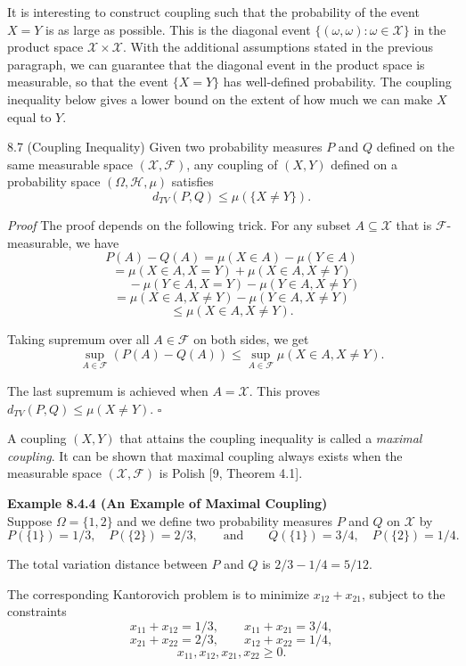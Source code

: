 It is interesting to construct coupling such that the probability of the event $X=Y$ is as large as possible. This is the diagonal event $\{(\omega,\omega): \omega\in \mathcal{X}\}$ in the product space $\mathcal{X}\times \mathcal{X}$. With the additional assumptions stated in the previous paragraph, we can guarantee that the diagonal event in the product space is measurable, so that the event $\{X=Y\}$ has well-defined probability. The coupling inequality below gives a lower bound on the extent of how much we can make $X$ equal to $Y$.

\begin{thmbox}{8.7 (Coupling Inequality)}
Given two probability measures $P$ and $Q$ defined on the same measurable space $(\mathcal{X},\mathcal{F})$, any coupling of $(X,Y)$ defined on a probability space $(\Omega,\mathcal{H},\mu)$ satisfies
\[
d_{TV}(P,Q)\le \mu(\{X\neq Y\}).
\]
\end{thmbox}

\textit{Proof} The proof depends on the following trick. For any subset $A\subseteq \mathcal{X}$ that is $\mathcal{F}$-measurable, we have
\[
P(A)-Q(A)=\mu(X\in A)-\mu(Y\in A)
\]
\[
=\mu(X\in A, X=Y)+\mu(X\in A, X\neq Y)
\]
\[
\qquad -\mu(Y\in A, X=Y)-\mu(Y\in A, X\neq Y)
\]
\[
=\mu(X\in A, X\neq Y)-\mu(Y\in A, X\neq Y)
\]
\[
\le \mu(X\in A, X\neq Y).
\]

Taking supremum over all $A\in \mathcal{F}$ on both sides, we get
\[
\sup_{A\in \mathcal{F}} (P(A)-Q(A))
\le
\sup_{A\in \mathcal{F}} \mu(X\in A, X\neq Y).
\]

The last supremum is achieved when $A=\mathcal{X}$. This proves $d_{TV}(P,Q)\le \mu(X\neq Y)$. \hfill $\square$

A coupling $(X,Y)$ that attains the coupling inequality is called a \textit{maximal coupling}. It can be shown that maximal coupling always exists when the measurable space $(\mathcal{X},\mathcal{F})$ is Polish [9, Theorem 4.1].

\textbf{Example 8.4.4 (An Example of Maximal Coupling)} \\
Suppose $\Omega=\{1,2\}$ and we define two probability measures $P$ and $Q$ on $\mathcal{X}$ by
\[
P(\{1\})=1/3,\quad P(\{2\})=2/3,
\qquad \text{and} \qquad
Q(\{1\})=3/4,\quad P(\{2\})=1/4.
\]

The total variation distance between $P$ and $Q$ is $2/3-1/4=5/12$.

The corresponding Kantorovich problem is to minimize $x_{12}+x_{21}$, subject to the constraints
\[
x_{11}+x_{12}=1/3,\qquad x_{11}+x_{21}=3/4,
\]
\[
x_{21}+x_{22}=2/3,\qquad x_{12}+x_{22}=1/4,
\]
\[
x_{11},x_{12},x_{21},x_{22}\ge 0.
\]


